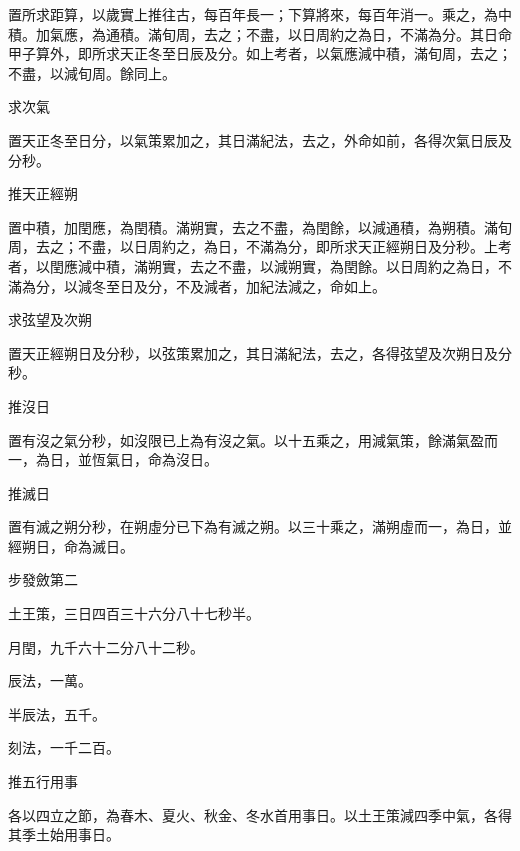 \begin{pinyinscope}
 置所求距算，以歲實上推往古，每百年長一；下算將來，每百年消一。乘之，為中積。加氣應，為通積。滿旬周，去之；不盡，以日周約之為日，不滿為分。其日命甲子算外，即所求天正冬至日辰及分。如上考者，以氣應減中積，滿旬周，去之；不盡，以減旬周。餘同上。



 求次氣



 置天正冬至日分，以氣策累加之，其日滿紀法，去之，外命如前，各得次氣日辰及分秒。



 推天正經朔



 置中積，加閏應，為閏積。滿朔實，去之不盡，為閏餘，以減通積，為朔積。滿旬周，去之；不盡，以日周約之，為日，不滿為分，即所求天正經朔日及分秒。上考者，以閏應減中積，滿朔實，去之不盡，以減朔實，為閏餘。以日周約之為日，不滿為分，以減冬至日及分，不及減者，加紀法減之，命如上。



 求弦望及次朔



 置天正經朔日及分秒，以弦策累加之，其日滿紀法，去之，各得弦望及次朔日及分秒。



 推沒日



 置有沒之氣分秒，如沒限已上為有沒之氣。以十五乘之，用減氣策，餘滿氣盈而一，為日，並恆氣日，命為沒日。



 推滅日



 置有滅之朔分秒，在朔虛分已下為有滅之朔。以三十乘之，滿朔虛而一，為日，並經朔日，命為滅日。



 步發斂第二



 土王策，三日四百三十六分八十七秒半。



 月閏，九千六十二分八十二秒。



 辰法，一萬。



 半辰法，五千。



 刻法，一千二百。



 推五行用事



 各以四立之節，為春木、夏火、秋金、冬水首用事日。以土王策減四季中氣，各得其季土始用事日。




\end{pinyinscope}
